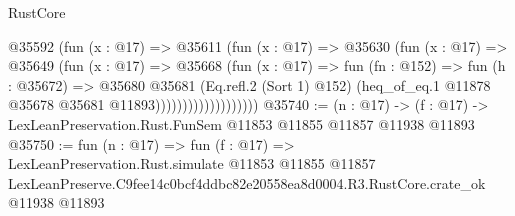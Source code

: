\begin{lexlean}{RustCore}
\begin{coremodule}
                            @35592
                              (fun (x : @17) =>
                              @35611
                                (fun (x : @17) =>
                                @35630
                                  (fun (x : @17) =>
                                  @35649
                                    (fun (x : @17) =>
                                    @35668
                                      (fun (x : @17) =>
                                      fun (fn : @152) =>
                                      fun (h : @35672) =>
                                      @35680
                                        @35681
                                        (Eq.refl.{2} (Sort 1) @152)
                                        (heq_of_eq.{1}
                                          @11878
                                          @35678
                                          @35681
                                          @11893)))))))))))))))))))
@35740 := (n : @17) ->
  (f : @17) -> LexLeanPreservation.Rust.FunSem @11853 @11855 @11857 @11938 @11893
@35750 := fun (n : @17) =>
  fun (f : @17) =>
  LexLeanPreservation.Rust.simulate
    @11853
    @11855
    @11857
    LexLeanPreserve.C9fee14c0bcf4ddbc82e20558ea8d0004.R3.RustCore.crate_ok
    @11938
    @11893
\end{coremodule}
\end{lexlean}

